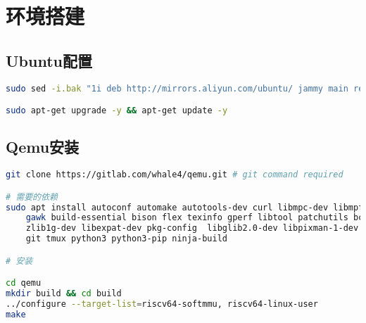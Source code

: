 \append

\listoffigures
\listoftables
\listofequations

\section*{环境搭建}

\subsection*{Ubuntu配置}

\begin{lstlisting}[language=bash, caption = Ubuntu 的国内源]
sudo sed -i.bak "1i deb http://mirrors.aliyun.com/ubuntu/ jammy main restricted universe multiverse \ndeb-src http://mirrors.aliyun.com/ubuntu/ jammy main restricted universe multiverse \ndeb http://mirrors.aliyun.com/ubuntu/ jammy-security main restricted universe multiverse \ndeb-src http://mirrors.aliyun.com/ubuntu/ jammy-security main restricted universe multiverse \ndeb http://mirrors.aliyun.com/ubuntu/ jammy-updates main restricted universe multiverse \ndeb-src http://mirrors.aliyun.com/ubuntu/ jammy-updates main restricted universe multiverse \ndeb http://mirrors.aliyun.com/ubuntu/ jammy-proposed main restricted universe multiverse \ndeb-src http://mirrors.aliyun.com/ubuntu/ jammy-proposed main restricted universe multiverse \ndeb hthttp://mirrors.aliyun.com/ubuntu/tp://mirrors.aliyun.com/ubuntu/ jammy-backports main restricted universe multiverse \ndeb-src http://mirrors.aliyun.com/ubuntu/ jammy-backports main restricted universe multiverse" /etc/apt/sources.list

sudo apt-get upgrade -y && apt-get update -y
\end{lstlisting}

\subsection*{Qemu安装}

\begin{lstlisting}[language=bash, caption = Qemu安装]
git clone https://gitlab.com/whale4/qemu.git # git command required

# 需要的依赖
sudo apt install autoconf automake autotools-dev curl libmpc-dev libmpfr-dev libgmp-dev  \               
    gawk build-essential bison flex texinfo gperf libtool patchutils bc \
    zlib1g-dev libexpat-dev pkg-config  libglib2.0-dev libpixman-1-dev libsdl2-dev \
    git tmux python3 python3-pip ninja-build

# 安装

cd qemu
mkdir build && cd build
../configure --target-list=riscv64-softmmu, riscv64-linux-user
make
\end{lstlisting}

